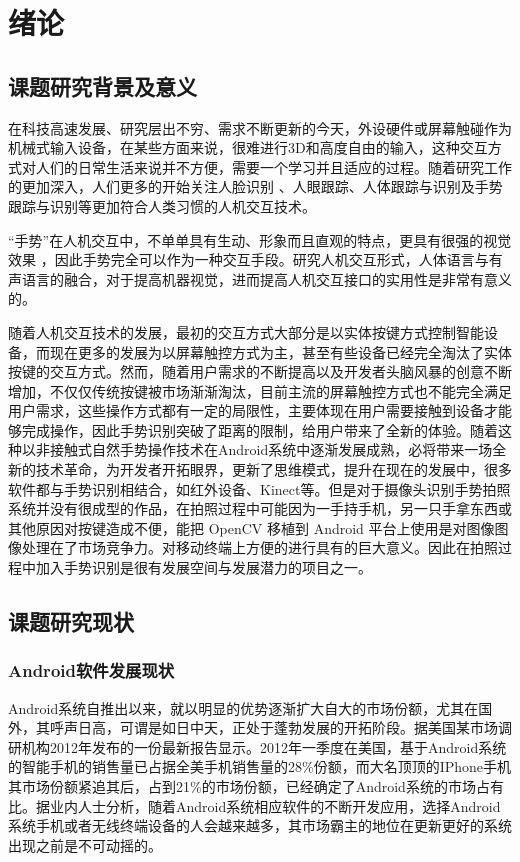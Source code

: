 \documentclass{XDBAthesis}
\begin{document}
\else
\fi
\chapter{绪论}
\section{课题研究背景及意义}

在科技高速发展、研究层出不穷、需求不断更新的今天，外设硬件或屏幕触碰作为机械式输入设备，在某些方面来说，很难进行3D和高度自由的输入，这种交互方式对人们的日常生活来说并不方便，需要一个学习并且适应的过程。随着研究工作的更加深入，人们更多的开始关注人脸识别 \cite{erol2007vision,lee1995model}、人眼跟踪、人体跟踪与识别及手势跟踪与识别等更加符合人类习惯的人机交互技术。

“手势”在人机交互中，不单单具有生动、形象而且直观的特点，更具有很强的视觉效果\cite{何阳清2004基于几何特征的手势识别算法研究} ，因此手势完全可以作为一种交互手段。研究人机交互形式，人体语言与有声语言的融合，对于提高机器视觉，进而提高人机交互接口的实用性是非常有意义的。

随着人机交互技术的发展，最初的交互方式大部分是以实体按键方式控制智能设备，而现在更多的发展为以屏幕触控方式为主，甚至有些设备已经完全淘汰了实体按键的交互方式。然而，随着用户需求的不断提高以及开发者头脑风暴的创意不断增加，不仅仅传统按键被市场渐渐淘汰，目前主流的屏幕触控方式也不能完全满足用户需求，这些操作方式都有一定的局限性，主要体现在用户需要接触到设备才能够完成操作，因此手势识别突破了距离的限制，给用户带来了全新的体验。随着这种以非接触式自然手势操作技术在Android系统中逐渐发展成熟，必将带来一场全新的技术革命，为开发者开拓眼界，更新了思维模式，提升在现在的发展中，很多软件都与手势识别相结合，如红外设备、Kinect等。但是对于摄像头识别手势拍照系统并没有很成型的作品，在拍照过程中可能因为一手持手机，另一只手拿东西或其他原因对按键造成不便，能把 OpenCV 移植到 Android 平台上使用是对图像图像处理在了市场竞争力。对移动终端上方便的进行具有的巨大意义。因此在拍照过程中加入手势识别是很有发展空间与发展潜力的项目之一。

\section{课题研究现状}

\subsection{Android软件发展现状}

Android系统自推出以来，就以明显的优势逐渐扩大自大的市场份额，尤其在国外，其呼声日高，可谓是如日中天，正处于蓬勃发展的开拓阶段\cite{张华2012android}。据美国某市场调研机构2012年发布的一份最新报告显示。2012年一季度在美国，基于Android系统的智能手机的销售量已占据全美手机销售量的28\%份额，而大名顶顶的IPhone手机其市场份额紧追其后，占到21\%的市场份额，已经确定了Android系统的市场占有比。据业内人士分析，随着Android系统相应软件的不断开发应用，选择Android系统手机或者无线终端设备的人会越来越多，其市场霸主的地位在更新更好的系统出现之前是不可动摇的。
\end{document}
